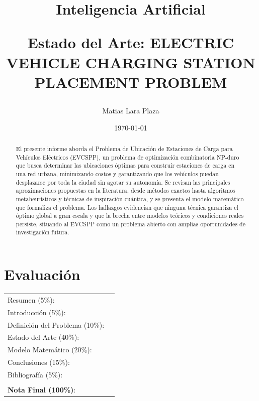 \documentclass[letter, 10pt]{article}
\begin{document}
\title{Inteligencia Artificial \\ \begin{Large}Estado del Arte: ELECTRIC VEHICLE CHARGING STATION PLACEMENT PROBLEM\end{Large}}
\author{Matias Lara Plaza}
\date{\today}
\maketitle


\section*{Evaluaci\'on}

\begin{tabular}{ll}
Resumen (5\%): & \underline{\hspace{2cm}} \\
Introducci\'on (5\%):  & \underline{\hspace{2cm}} \\
Definici\'on del Problema (10\%):  & \underline{\hspace{2cm}} \\
Estado del Arte (40\%):  & \underline{\hspace{2cm}} \\
Modelo Matem\'atico (20\%): &  \underline{\hspace{2cm}}\\
Conclusiones (15\%): &  \underline{\hspace{2cm}}\\
Bibliograf\'ia (5\%): & \underline{\hspace{2cm}}\\
 &  \\
\textbf{Nota Final (100\%)}:   & \underline{\hspace{2cm}}
\end{tabular}
\vspace{2cm}


\begin{abstract}
El presente informe aborda el Problema de Ubicación de Estaciones de Carga para 
Vehículos Eléctricos (EVCSPP), un problema de optimización combinatoria NP-duro 
que busca determinar las ubicaciones óptimas para construir estaciones de carga en 
una red urbana, minimizando costos y garantizando que los vehículos puedan 
desplazarse por toda la ciudad sin agotar su autonomía. Se revisan las principales 
aproximaciones propuestas en la literatura, desde métodos exactos hasta algoritmos 
metaheurísticos y técnicas de inspiración cuántica, y se presenta el modelo matemático 
que formaliza el problema. Los hallazgos evidencian que ninguna técnica garantiza el 
óptimo global a gran escala y que la brecha entre modelos teóricos y condiciones 
reales persiste, situando al EVCSPP como un problema abierto con amplias 
oportunidades de investigación futura.
\end{abstract}
\newpage
\end{document}
